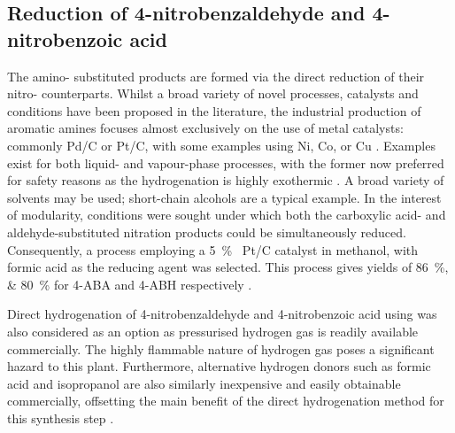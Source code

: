 
\subsection{Reduction of 4-nitrobenzaldehyde and 4-nitrobenzoic acid}

The amino- substituted products are formed via the direct reduction of their nitro- counterparts. Whilst a broad variety of novel processes, catalysts and conditions have been proposed in the literature, the industrial production of aromatic amines focuses almost exclusively on the use of metal catalysts: commonly Pd/C or Pt/C, with some examples using Ni, Co, or Cu \cite{vogt_amines_2000,cartolano_amines_2004}. Examples exist for both liquid- and vapour-phase processes, with the former now preferred for safety reasons as the hydrogenation is highly exothermic \cite{vogt_amines_2000}. A broad variety of solvents may be used; short-chain alcohols are a typical example. In the interest of modularity, conditions were sought under which both the carboxylic acid- and aldehyde-substituted nitration products could be simultaneously reduced. Consequently, a process employing a \SI{5}{\percent\ww} Pt/C catalyst in methanol, with formic acid as the reducing agent was selected. This process gives yields of \SIlist{86;80}{\percent} for 4-ABA and 4-ABH respectively \cite{gowda_catalytic_2000}.

Direct hydrogenation of 4-nitrobenzaldehyde and 4-nitrobenzoic acid using  was also considered as an option as pressurised hydrogen gas is readily available commercially. The highly flammable nature of hydrogen gas poses a significant hazard to this plant. Furthermore, alternative hydrogen donors such as formic acid and isopropanol are also similarly inexpensive and easily obtainable commercially, offsetting the main benefit of the direct hydrogenation method for this synthesis step \cite{wang_golden_nodate}. 

